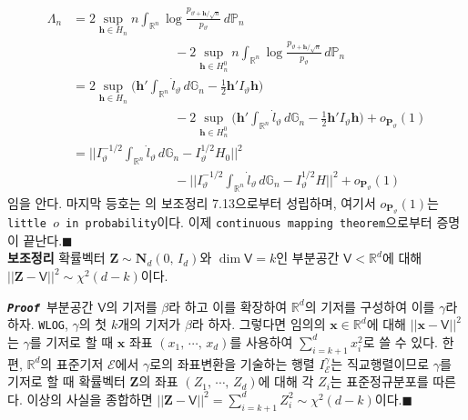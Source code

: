 \documentclass[11pt,onecolumn,twoside,a4size]{gsag3jnl}
\newcommand{\proof}{\texttt{\textit{\textbf{Proof }}}}
\begin{document}
\begin{align}
  \Lambda_n&=2\sup_{\mathbf{h}\in H_n}n\int_{\mathbb{R}^n}\log\frac{p_{\vartheta+\mathbf{h}/\sqrt{n}}}{p_{\vartheta}}\,d\mathbb{P}_n\\
  &\qquad\qquad\qquad\qquad-2\sup_{\mathbf{h}\in H_n^0}n\int_{\mathbb{R}^n}\log\frac{p_{\vartheta+\mathbf{h}/\sqrt{n}}}{p_{\vartheta}}\,d\mathbb{P}_n\nonumber\\
  &=2\sup_{\mathbf{h}\in H_n}\bigg(\mathbf{h}'\int_{\mathbb{R}^n}\dot{l}_\vartheta\,d\mathbb{G}_n-\frac{1}{2}\mathbf{h}'I_\vartheta\mathbf{h}\bigg)\nonumber\\
  &\qquad\qquad\qquad\qquad-2\sup_{\mathbf{h}\in H_n^0}\bigg(\mathbf{h}'\int_{\mathbb{R}^n}\dot{l}_\vartheta\,d\mathbb{G}_n-\frac{1}{2}\mathbf{h}'I_\vartheta\mathbf{h}\bigg)+o_{\mathbf{P}_\vartheta}(1)\nonumber\\
  &=\bigg|\bigg|I_\vartheta^{-1/2}\int_{\mathbb{R}^n}\dot{l}_\vartheta\,d\mathbb{G}_n-I_\vartheta^{1/2}H_0\bigg|\bigg|^2\nonumber\\
  &\qquad\qquad\qquad\qquad-\bigg|\bigg|I_\vartheta^{-1/2}\int_{\mathbb{R}^n}\dot{l}_\vartheta\,d\mathbb{G}_n-I_\vartheta^{1/2}H\bigg|\bigg|^2+o_{\mathbf{P}_\vartheta}(1)\nonumber
\end{align}
임을 안다. 마지막 등호는 \texttt{\cite{van2000asymptotic}}의 보조정리 7.13으로부터 성립하며, 여기서 $o_{\mathbf{P}_\vartheta}(1)$는 \texttt{little $o$ in probability}이다. 이제 \texttt{continuous mapping theorem}으로부터 증명이 끝난다.\hfill$\blacksquare$\\

\noindent\textsf{\textbf{보조정리} 확률벡터 $\mathbf{Z}\sim\mathbf{N}_d(0,\,I_d)$와 $\dim\mathsf{V}=k$인 부분공간 $\mathsf{V}<\mathbb{R}^d$에 대해 $||\mathbf{Z}-\mathsf{V}||^2\sim\chi^2(d-k)$이다.}

\proof 부분공간 $\mathsf{V}$의 기저를 $\beta$라 하고 이를 확장하여 $\mathbb{R}^d$의 기저를 구성하여 이를 $\gamma$라 하자. \texttt{WLOG}, $\gamma$의 첫 $k$개의 기저가 $\beta$라 하자. 그렇다면 임의의 $\mathbf{x}\in\mathbb{R}^d$에 대해 $||\mathbf{x}-\mathsf{V}||^2$는 $\gamma$를 기저로 할 때 $\mathbf{x}$ 좌표 $(x_1,\,\cdots,\,x_d)$를 사용하여 $\sum_{i=k+1}^dx_i^2$로 쓸 수 있다. 한편, $\mathbb{R}^d$의 표준기저 $\mathcal{E}$에서 $\gamma$로의 좌표변환을 기술하는 행렬 $I_{\mathcal{E}}^{\gamma}$는 직교행렬이므로 $\gamma$를 기저로 할 때 확률벡터 $\mathbf{Z}$의 좌표 $(Z_1,\,\cdots,\,Z_d)$에 대해 각 $Z_i$는 표준정규분포를 따른다. 이상의 사실을 종합하면 $||\mathbf{Z}-\mathsf{V}||^2=\sum_{i=k+1}^dZ_i^2\sim\chi^2(d-k)$이다.\hfill$\blacksquare$\\
\end{document}
